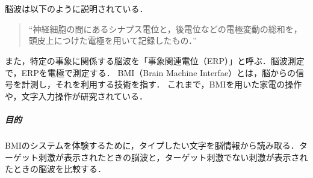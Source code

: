 \chapter{\kadaie}
\section{\purpose}
脳波は以下のように説明されている．
\begin{quote}
    ``神経細胞の間にあるシナプス電位と，後電位などの電極変動の総和を，頭皮上につけた電極を用いて記録したもの．''
    \\\hfill\cite{自己心理学セミナー}
\end{quote}
また，特定の事象に関係する脳波を「事象関連電位（ERP）」と呼ぶ．脳波測定で，ERPを電極で測定する．
BMI（Brain Machine Interfae）とは，脳からの信号を計測し，それを利用する技術を指す\cite{脳波による実用的なBMI研究開発}．
これまで，BMIを用いた家電の操作や，文字入力操作が研究されている\cite{脳波による実用的なBMI研究開発}．
\paragraph{目的}BMIのシステムを体験するために，タイプしたい文字を脳情報から読み取る．ターゲット刺激が表示されたときの脳波と，ターゲット刺激でない刺激が表示されたときの脳波を比較する．
\section{\method}
